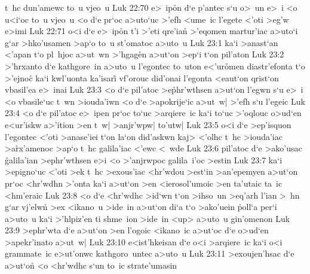 t~hc
dun'amewc
to~u
vjeo~u\bibvsend
\vs Luk 22:70
e>~ip\r{o}n
d`e
p'antec
s`u
o>~un
e>~i
<o
u<i`oc
to~u
vjeo~u
<o
d`e
pr`oc
a>uto`uc
>'efh
<ume~ic
l'egete
<'oti
>eg'w
e>imi\bibvsend
\vs Luk 22:71
o<i
d`e
e>~ip\r{o}n
t'i
>'eti
qre'ian\r{}
>'eqomen
martur'iac
a>uto`i
g`ar
>hko'usamen
>ap`o
to~u
st'omatoc
a>uto~u\bibvsend
\vs Luk 23:1
ka`i
>anast`an
<'apan
t`o
pl~hjoc
a>ut~wn
>'hgag\r{e}n
a>ut`on
>ep`i
t`on
pil'aton\bibvsend
\vs Luk 23:2
>'hrxanto
d`e
kathgore~in
a>uto~u
l'egontec
to~uton
e<'u\-r\r{o}\-men
diastr'efonta
t`o
>'ejno\r{c}
ka`i
kwl'uonta
ka'isari\r{}
vf'orouc
did'onai
l'egonta
<eaut`on
qrist`on
vbasil'ea
e>~inai\bibvsend
\vs Luk 23:3
<o
d`e
pil'atoc
>e\r{p}h\-r'w\-th\-sen
a>ut`on
l'egwn
s`u
e>~i
<o
vbasile`uc
t~wn
>iouda'iwn
<o
d`e
>apokrije`ic
a>ut~w|
>'efh
s`u
l'egeic\bibvsend
\vs Luk 23:4
<o
d`e
pil'atoc
e>~ipen
pr`oc
to`uc
>arqiere~ic
ka`i
to`uc
>'oqlouc
o>ud`en
e<ur'iskw
a>'ition
>en
t~w|
>anjr'wpw|
to'utw|\bibvsend
\vs Luk 23:5
o<i
d`e
>ep'isquon
l'egontec
<'oti
>anase'iei
t`on
la`on
did'askwn
kaj>
<'olhc
t~hc
>iouda'iac
>a\r{r}x'amenoc
>ap`o
t~hc
galila'iac
<'ewc
<~wde\bibvsend
\vs Luk 23:6
pil'atoc
d`e
>ako'usac
\r{g}alila'ian
>ephr'wthsen
e>i
<o
>'anjrwpoc
galila~i'oc
>estin\bibvsend
\vs Luk 23:7
ka`i
>epigno`uc
<'oti
>ek
t~hc
>exous'iac
<hr'wdou
>est`in
>an'epemyen
a>ut`on
pr`oc
<hr'wdhn
>'onta
ka`i
a>ut`on
>en
<ierosol'umoic
>en
ta'utaic
ta~ic
<hm'eraic\bibvsend
\vs Luk 23:8
<o
d`e
<hr'wdhc
>id`wn
t`on
>ihso~un
>eq'arh
l'ian
>~hn
g`ar
vj'elwn\r{}
>ex
<ikano~u
>ide~in
a>ut`on
di`a
t`o
>ako'uein
\r{p}oll`a
per`i
a>uto~u
ka`i
>'hlpiz'en
ti
shme~ion
>ide~in
<up>
a>uto~u
gin'omenon\bibvsend
\vs Luk 23:9
>ephr'wta
d`e
a>ut`on
>en
l'ogoic
<ikano~ic
a>ut`oc
d`e
o>ud`en
>apekr'inato
a>ut~w|\bibvsend
\vs Luk 23:10
e<ist'hkeisan
d`e
o<i
>arqiere~ic
ka`i
o<i
grammate~ic
e>ut'onwc
kathgoro~untec
a>uto~u\bibvsend
\vs Luk 23:11
>exoujen'hsac
d`e
a>ut`o\r{n}
<o
<hr'wdhc
s`un
to~ic
strate'umasin
